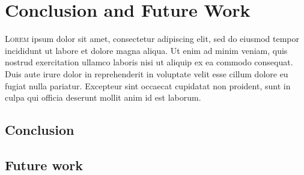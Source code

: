 

\chapter{Conclusion and Future Work}



\lettrine{L}{orem} ipsum dolor sit amet, consectetur
adipiscing elit, sed do eiusmod tempor incididunt ut labore et dolore magna
aliqua. Ut enim ad minim veniam, quis nostrud exercitation ullamco laboris nisi
ut aliquip ex ea commodo consequat. Duis aute irure dolor in reprehenderit in
voluptate velit esse cillum dolore eu fugiat nulla pariatur. Excepteur sint
occaecat cupidatat non proident, sunt in culpa qui officia deserunt mollit anim
id est laborum.


\section{Conclusion}


\section{Future work}
